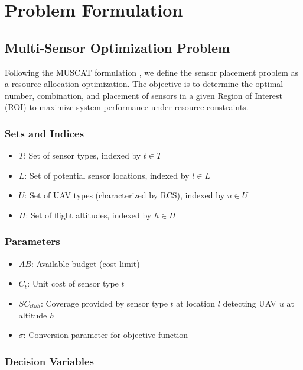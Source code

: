 
\section{Problem Formulation}

\subsection{Multi-Sensor Optimization Problem}

Following the MUSCAT formulation \cite{muscat2023}, we define the sensor placement problem as a resource allocation optimization. The objective is to determine the optimal number, combination, and placement of sensors in a given Region of Interest (ROI) to maximize system performance under resource constraints.

\subsubsection{Sets and Indices}

\begin{itemize}
\item $T$: Set of sensor types, indexed by $t \in T$
\item $L$: Set of potential sensor locations, indexed by $l \in L$
\item $U$: Set of UAV types (characterized by RCS), indexed by $u \in U$
\item $H$: Set of flight altitudes, indexed by $h \in H$
\end{itemize}

\subsubsection{Parameters}

\begin{itemize}
\item $AB$: Available budget (cost limit)
\item $C_t$: Unit cost of sensor type $t$
\item $SC_{tluh}$: Coverage provided by sensor type $t$ at location $l$ detecting UAV $u$ at altitude $h$
\item $\sigma$: Conversion parameter for objective function
\end{itemize}

\subsubsection{Decision Variables}

